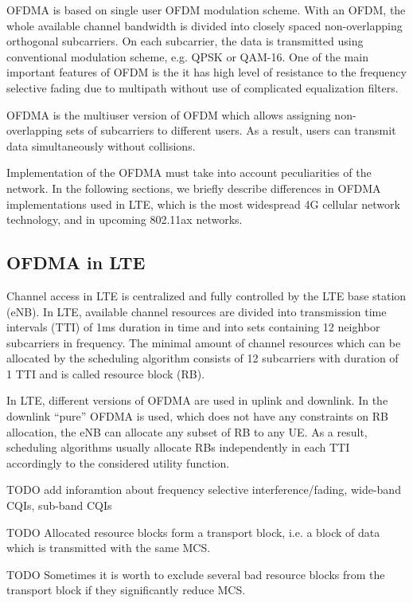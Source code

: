 \documentclass[conference]{IEEEtran}
\begin{document}
OFDMA  is based on single user OFDM modulation scheme. With an OFDM, the whole available channel bandwidth is divided into closely spaced non-overlapping orthogonal subcarriers. On each subcarrier, the data is transmitted using conventional modulation scheme, e.g. QPSK or QAM-16. One of the main important features of OFDM is the it has  high level of resistance to the frequency selective fading due to multipath without use of complicated equalization filters. 

OFDMA is the multiuser version of OFDM which allows assigning non-overlapping sets of subcarriers to different users. As a result, users can transmit data simultaneously without collisions.

Implementation of the OFDMA must take into account peculiarities of the network. In the following sections, we briefly describe differences in OFDMA implementations used in LTE, which is the most widespread 4G cellular network technology, and in upcoming 802.11ax networks. %

\subsection{OFDMA in LTE}

Channel access in LTE is centralized and fully controlled by the LTE base station (eNB). In LTE, available channel resources are divided into transmission time intervals (TTI) of 1ms duration in time and into sets containing 12 neighbor subcarriers in frequency. The minimal amount of channel resources which can be allocated by the scheduling algorithm consists of 12 subcarriers with duration of 1 TTI and is called resource block (RB). 

In LTE, different versions of OFDMA are used in uplink and downlink. In the downlink ``pure'' OFDMA is used, which does not have any constraints on RB allocation, the eNB can allocate any subset of RB to any UE. As a result, scheduling algorithms usually allocate RBs independently in each TTI accordingly to the considered utility function.

TODO add inforamtion about frequency selective interference/fading, wide-band CQIs, sub-band CQIs

TODO Allocated resource blocks form a transport block, i.e. a block of data which is transmitted with the same MCS. 

TODO Sometimes it is worth to exclude several bad resource blocks from the transport block if they significantly reduce MCS.
\end{document}
